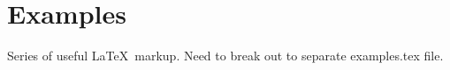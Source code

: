 
\newpage
\section{Examples}
Series of useful \LaTeX\ markup. Need to break out to 
separate examples.tex file.


